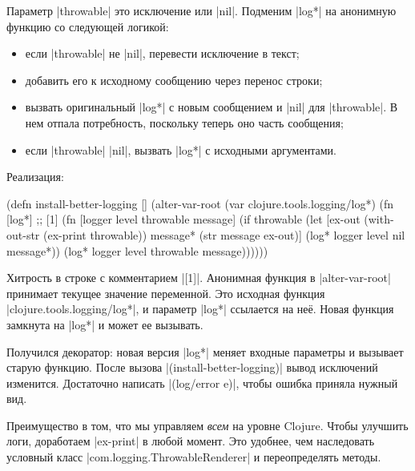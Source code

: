 Параметр \spverb|throwable| это исключение или \spverb|nil|. Подменим
\spverb|log*| на анонимную функцию со следующей логикой:

\begin{itemize}

\item
  если \spverb|throwable| не \spverb|nil|, перевести исключение в текст;

\item
  добавить его к исходному сообщению через перенос строки;

\item
  вызвать оригинальный \spverb|log*| с новым сообщением и \spverb|nil| для
  \spverb|throwable|. В нем отпала потребность, поскольку теперь оно часть
  сообщения;

\item
  если \spverb|throwable| \spverb|nil|, вызвать \spverb|log*| с исходными
  аргументами.

\end{itemize}

\noindent
Реализация:

\begin{english}
  \begin{clojure}
(defn install-better-logging []
  (alter-var-root
   (var clojure.tools.logging/log*)
   (fn [log*] ;; [1]
     (fn [logger level throwable message]
       (if throwable
         (let [ex-out (with-out-str (ex-print throwable))
               message* (str message \newline ex-out)]
           (log* logger level nil message*))
         (log* logger level throwable message))))))
  \end{clojure}
\end{english}

Хитрость в строке с комментарием \spverb|[1]|. Анонимная функция в
\spverb|alter-var-root| принимает текущее значение переменной. Это исходная
функция \spverb|clojure.tools.logging/log*|, и параметр \spverb|log*| ссылается
на не\"{е}. Новая функция замкнута на \spverb|log*| и может ее вызывать.

Получился декоратор: новая версия \spverb|log*| меняет входные параметры и
вызывает старую функцию. После вызова \spverb|(install-better-logging)| вывод
исключений изменится. Достаточно написать \spverb|(log/error e)|, чтобы ошибка
приняла нужный вид.

Преимущество в том, что мы управляем \emph{всем} на уровне Clojure. Чтобы
улучшить логи, доработаем \spverb|ex-print| в любой момент. Это удобнее, чем
наследовать условный класс \spverb|com.logging.ThrowableRenderer| и
переопределять методы.

